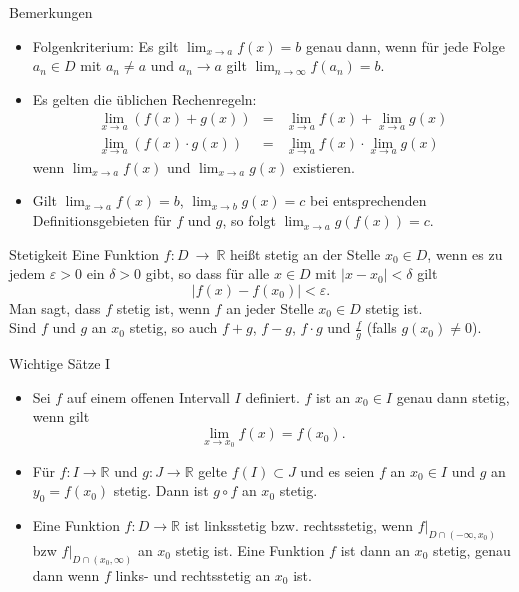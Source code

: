 \documentclass[notes=hide,hyperref={dvipdfmx,pdfpagelabels=false}]{beamer}
\begin{document}
\begin{frame}{Bemerkungen}
\begin{itemize}
\item \alert{Folgenkriterium}: Es gilt $ \lim_{x \rightarrow a} f(x) =b$
genau dann, wenn für jede Folge $a_n \in D$ mit $a_n \neq a$ und $a_n \rightarrow a$
gilt $\lim_{n \rightarrow \infty} f(a_n)=b$.
\item Es gelten die üblichen Rechenregeln:
\begin{eqnarray*}
\lim_{x \rightarrow a}(f(x)+g(x)) &=&\lim_{x \rightarrow a} f(x) +
\lim_{x \rightarrow a} g(x) \\
\lim_{x \rightarrow a}(f(x) \cdot g(x)) &=& \lim_{x \rightarrow a}
f(x) \cdot \lim_{x \rightarrow a} g(x)
\end{eqnarray*}
wenn $\lim_{x \rightarrow a} f(x)$ und $\lim_{x \rightarrow a}g(x)$
existieren. 
\item Gilt $\lim_{x \rightarrow a} f(x)=b$, $\lim_{x \rightarrow b}
g(x)=c$ bei entsprechenden Definitionsgebieten für $f$ und $g$, so
folgt $\lim_{x \rightarrow a} g(f(x)) =c$.
\end{itemize}
\end{frame}



\begin{frame}{Stetigkeit}
Eine Funktion $f:D \ \rightarrow  \ \mathbb{R}$ heißt {\color{red} stetig an
der Stelle $x_0 \in D$}, wenn es zu jedem $\varepsilon>0$ ein $\delta>0$
gibt, so dass für alle $x \in D$ mit $|x - x_0| < \delta$ gilt
\[ |f(x)-f(x_0) | < \varepsilon .\]
Man sagt, dass $f$ {\color{red} stetig} ist, wenn $f$ an jeder Stelle $x_0
\in D$ stetig ist. \\
Sind $f$ und $g$ an $x_0$ stetig, so auch $f+g$, $f-g$, $f \cdot g$
und $\frac{f}{g}$ (falls $g(x_0) \neq 0$). 
\end{frame}

\begin{frame}{Wichtige Sätze I}
\begin{itemize}
\item Sei $f$ auf einem offenen Intervall $I$ definiert. $f$ ist an
$x_0 \in I$ genau dann stetig, wenn gilt
\[ \lim_{x \rightarrow x_0} f(x) = f(x_0). \]
\item Für $f:I \rightarrow \mathbb{R}$ und $g:J \rightarrow
\mathbb{R}$ gelte $f(I) \subset J$ und es seien $f$ an $x_0 \in I$ und
$g$ an $y_0=f(x_0)$ stetig. Dann ist $g \circ f$ an $x_0$ stetig.
\item Eine Funktion $f: D \rightarrow \mathbb{R}$ ist {\color{red}
linksstetig} bzw. {\color{red} rechtsstetig}, wenn $f|_{D\cap (-\infty,x_0)}$
bzw  $f|_{D\cap (x_0,\infty)}$ an $x_0$ stetig ist. Eine Funktion $f$
ist dann an $x_0$ stetig, genau dann wenn $f$ links- und rechtsstetig
an $x_0$ ist.
\end{itemize}
\end{frame}
\end{document}
